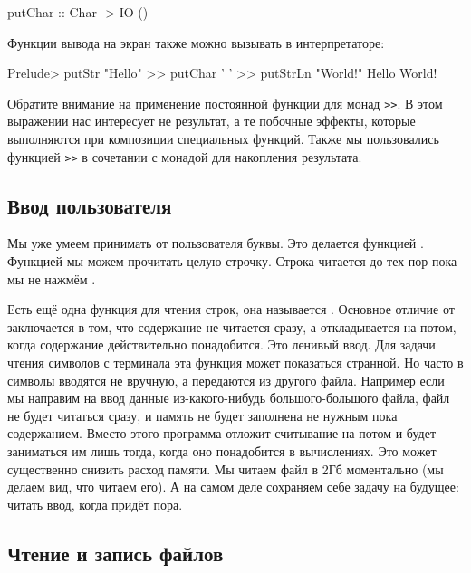 \begin{code}
putChar :: Char -> IO ()
\end{code}

Функции вывода на экран также можно вызывать в интерпретаторе:


\begin{code}
Prelude> putStr "Hello" >> putChar ' ' >> putStrLn "World!" 
Hello World!
\end{code}

Обратите внимание на применение постоянной функции для монад
\verb!>>!. В этом выражении нас интересует не результат, 
а те побочные эффекты, которые выполняются при композиции
специальных функций. Также мы пользовались функцией \verb!>>!
в сочетании с монадой  для накопления результата.

\subsection{Ввод пользователя}

Мы уже умеем принимать от пользователя буквы. Это
делается функцией . Функцией 
мы можем прочитать целую строчку. Строка читается
до тех пор пока мы не нажмём .


Есть ещё одна функция для чтения строк, она называется
. Основное отличие от  
заключается в том, что содержание не читается сразу,
а откладывается на потом, когда содержание действительно
понадобится. Это ленивый ввод. Для задачи чтения символов
с терминала эта функция может показаться странной.
Но часто в символы вводятся не вручную, а передаются из 
другого файла. Например если мы направим на ввод данные
из-какого-нибудь большого-большого файла, файл не будет
читаться сразу, и память не будет заполнена не нужным 
пока содержанием. Вместо этого программа отложит считывание
на потом и будет заниматься им лишь тогда, когда оно понадобится
в вычислениях. Это может существенно снизить расход памяти.
Мы читаем файл в 2Гб моментально (мы делаем вид, что читаем его).
А на самом деле сохраняем себе задачу на будущее: читать ввод,
когда придёт пора.

\subsection{Чтение и запись файлов}


